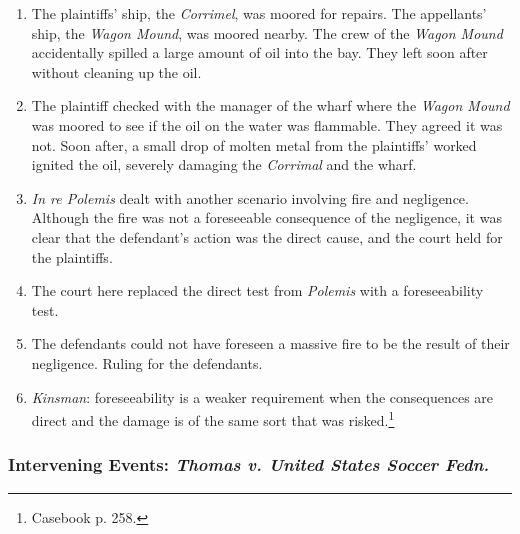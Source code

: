 \begin{enumerate}
    \item The plaintiffs' ship, the \emph{Corrimel}, was moored for repairs. The appellants' ship, the \emph{Wagon Mound}, was moored nearby. The crew of the \emph{Wagon Mound} accidentally spilled a large amount of oil into the bay. They left soon after without cleaning up the oil.
    \item The plaintiff checked with the manager of the wharf where the \emph{Wagon Mound} was moored to see if the oil on the water was flammable. They agreed it was not. Soon after, a small drop of molten metal from the plaintiffs' worked ignited the oil, severely damaging the \emph{Corrimal} and the wharf.
    \item \emph{In re Polemis} dealt with another scenario involving fire and negligence. Although the fire was not a foreseeable consequence of the negligence, it was clear that the defendant's action was the direct cause, and the court held for the plaintiffs.
    \item The court here replaced the direct test from \emph{Polemis} with a foreseeability test.
    \item The defendants could not have foreseen a massive fire to be the result of their negligence. Ruling for the defendants.
    \item \emph{Kinsman}: foreseeability is a weaker requirement when the consequences are direct and the damage is of the same sort that was risked.\footnote{Casebook p. 258.}
\end{enumerate}

\subsubsection{Intervening Events: \emph{Thomas v. United States Soccer Fedn.}}

